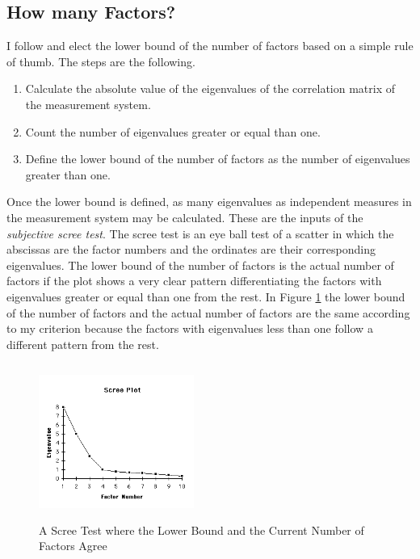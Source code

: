 \subsection{How many Factors?} \label{section:nfactors}
\noindent I follow \citet{guttman1954some} and elect the lower bound of the number of factors based on a simple rule of thumb. The steps are the following.
\begin{enumerate}
\item Calculate the absolute value of the eigenvalues of the correlation matrix of the measurement system.
\item Count the number of eigenvalues greater or equal than one.
\item Define the lower bound of the number of factors as the number of eigenvalues greater than one.
\end{enumerate} 

\indent Once the lower bound is defined, as many eigenvalues as independent measures in the measurement system may be calculated. These are the inputs of the \textit{subjective scree test}. The scree test is an eye ball test of a scatter in which the abscissas are the factor numbers and the ordinates are their corresponding eigenvalues. The lower bound of the number of factors is the actual number of factors if the plot shows a very clear pattern differentiating the factors with eigenvalues greater or equal than one from the rest. In Figure \ref{fig:scree} the lower bound of the number of factors and the actual number of factors are the same according to my criterion because the factors with eigenvalues less than one follow a different pattern from the rest. 

\begin{figure}[H]
	\caption{A Scree Test where the Lower Bound and the Current Number of Factors Agree} \label{fig:scree}
  	\includegraphics[width=2in, height=2in]{screetest.png}
\end{figure}